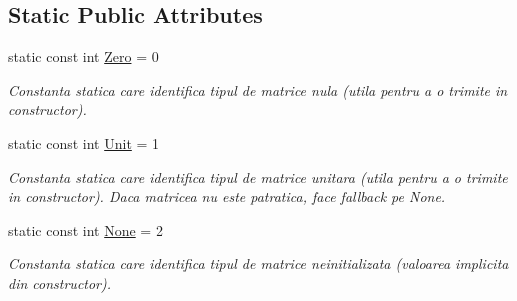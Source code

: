 \subsection*{Static Public Attributes}
\begin{DoxyCompactItemize}
\item 
\hypertarget{classMatrix_a598b23c7c96c1a1c068bbf49ef4ea8ac}{
static const int \hyperlink{classMatrix_a598b23c7c96c1a1c068bbf49ef4ea8ac}{Zero} = 0}
\label{classMatrix_a598b23c7c96c1a1c068bbf49ef4ea8ac}

\begin{DoxyCompactList}\small\item\em Constanta statica care identifica tipul de matrice nula (utila pentru a o trimite in constructor). \item\end{DoxyCompactList}\item 
\hypertarget{classMatrix_a39799dca149367cbeefb335cbd349c7e}{
static const int \hyperlink{classMatrix_a39799dca149367cbeefb335cbd349c7e}{Unit} = 1}
\label{classMatrix_a39799dca149367cbeefb335cbd349c7e}

\begin{DoxyCompactList}\small\item\em Constanta statica care identifica tipul de matrice unitara (utila pentru a o trimite in constructor). Daca matricea nu este patratica, face fallback pe None. \item\end{DoxyCompactList}\item 
\hypertarget{classMatrix_ac576343229d4c60eb7270123baf1eb08}{
static const int \hyperlink{classMatrix_ac576343229d4c60eb7270123baf1eb08}{None} = 2}
\label{classMatrix_ac576343229d4c60eb7270123baf1eb08}

\begin{DoxyCompactList}\small\item\em Constanta statica care identifica tipul de matrice neinitializata (valoarea implicita din constructor). \item\end{DoxyCompactList}\end{DoxyCompactItemize}
